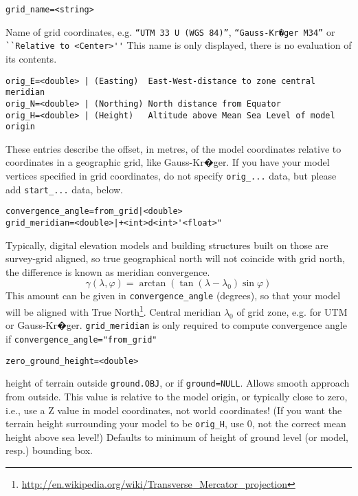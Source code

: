 \documentclass[a4paper]{article}
\newcommand{\filename}[1]{\texttt{#1}}
\begin{document}
\begin{verbatim}
grid_name=<string> 
\end{verbatim}
Name of grid coordinates, e.g. \texttt{``UTM 33 U (WGS 84)''}, \texttt{``Gauss-Kr�ger M34''} or \verb|``Relative to <Center>''| 
                       This name is only displayed, there is no evaluation of its contents.

\begin{verbatim}
orig_E=<double> | (Easting)  East-West-distance to zone central meridian
orig_N=<double> | (Northing) North distance from Equator
orig_H=<double> | (Height)   Altitude above Mean Sea Level of model origin
\end{verbatim}
These entries describe the offset, in metres, of the model coordinates relative to coordinates in a geographic grid, like Gauss-Kr�ger.
If you have your model vertices specified in grid coordinates, do not specify \verb|orig_...| data, 
but please add \verb|start_...| data, below. 


\begin{verbatim}
convergence_angle=from_grid|<double> 
grid_meridian=<double>|+<int>d<int>'<float>"      
\end{verbatim}
Typically, digital elevation models and building structures built on those are survey-grid aligned, so true
geographical north will not coincide with grid north, the difference
is known as meridian convergence. 
\begin{equation}
\gamma(\lambda, \varphi)=\arctan(\tan(\lambda-\lambda_0)\sin\varphi)
\end{equation}
This amount can be given in \verb|convergence_angle|
(degrees), so that your model will be aligned with True North\footnote{%
\url{http://en.wikipedia.org/wiki/Transverse_Mercator_projection}}.
Central meridian $\lambda_0$ of grid zone, e.g. for UTM or Gauss-Kr�ger. 
\verb|grid_meridian| is  only required to compute convergence angle if \verb|convergence_angle="from_grid"|

\begin{verbatim}
zero_ground_height=<double> 
\end{verbatim}
height of terrain outside \filename{ground.OBJ}, or if \verb|ground=NULL|. Allows smooth
approach from outside.  This value is relative to the model origin, or
typically close to zero, i.e.,  use a Z value in model coordinates, not
world coordinates! (If you want the terrain height surrounding
your model to be \verb|orig_H|, use 0, not the correct mean height above sea
level!)  Defaults to minimum of height of ground level (or model, resp.)
bounding box.
\end{document}
